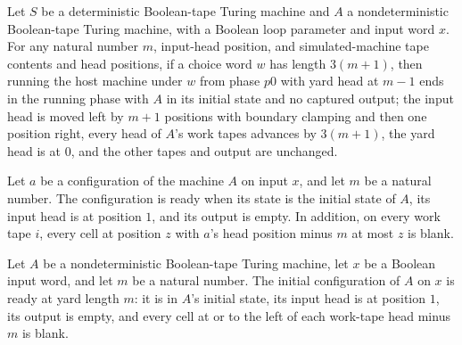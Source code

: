 \begin{theorem}
\label{Turing.ClockHost.reset_run}
\leanok
{}
Let $S$ be a deterministic Boolean-tape Turing machine and $A$ a nondeterministic
Boolean-tape Turing machine, with a Boolean loop parameter and input word $x$. For any
natural number $m$, input-head position, and simulated-machine tape contents and head
positions, if a choice word $w$ has length $3(m+1)$, then running the host machine under
$w$ from phase $p0$ with yard head at $m-1$ ends in the running phase with $A$ in its
initial state and no captured output; the input head is moved left by $m+1$ positions
with boundary clamping and then one position right, every head of $A$’s work tapes
advances by $3(m+1)$, the yard head is at $0$, and the other tapes and output are
unchanged.
\end{theorem}

\begin{definition}
\label{Turing.ClockHost.ReadyAt}
\leanok
{}
Let $a$ be a configuration of the machine $A$ on input $x$, and let $m$ be a natural
number. The configuration is ready when its state is the initial state of $A$, its input
head is at position $1$, and its output is empty. In addition, on every work tape $i$,
every cell at position $z$ with $a$'s head position minus $m$ at most $z$ is blank.
\end{definition}

\begin{theorem}
\label{Turing.ClockHost.readyAt_initCfg}
\leanok
{}
Let $A$ be a nondeterministic Boolean-tape Turing machine, let $x$ be a Boolean input
word, and let $m$ be a natural number. The initial configuration of $A$ on $x$ is ready
at yard length $m$: it is in $A$’s initial state, its input head is at position $1$, its
output is empty, and every cell at or to the left of each work-tape head minus $m$ is
blank.
\end{theorem}

